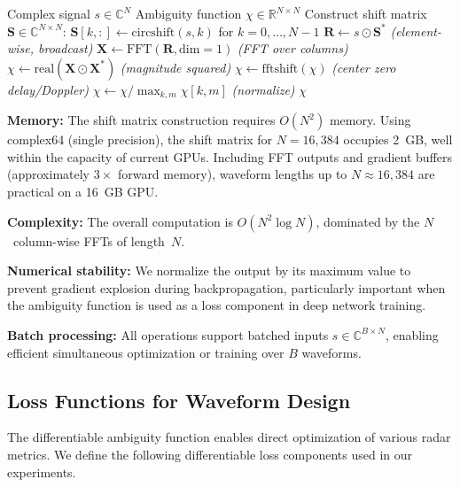 \documentclass[journal]{IEEEtran}
\begin{document}
\begin{algorithm}[t]
\caption{Differentiable Ambiguity Function}
\label{alg:ambiguity}
\begin{algorithmic}[1]
\REQUIRE Complex signal $s \in \mathbb{C}^N$
\ENSURE Ambiguity function $\chi \in \mathbb{R}^{N \times N}$
\STATE Construct shift matrix $\mathbf{S} \in \mathbb{C}^{N \times N}$:
\STATE \quad $\mathbf{S}[k, :] \leftarrow \text{circshift}(s, k)$ for $k = 0, \ldots, N-1$
\STATE $\mathbf{R} \leftarrow s \odot \mathbf{S}^*$ \hfill \textit{(element-wise, broadcast)}
\STATE $\mathbf{X} \leftarrow \text{FFT}(\mathbf{R}, \text{dim}=1)$ \hfill \textit{(FFT over columns)}
\STATE $\chi \leftarrow \text{real}(\mathbf{X} \odot \mathbf{X}^*)$ \hfill \textit{(magnitude squared)}
\STATE $\chi \leftarrow \text{fftshift}(\chi)$ \hfill \textit{(center zero delay/Doppler)}
\STATE $\chi \leftarrow \chi / \max_{k,m} \chi[k,m]$ \hfill \textit{(normalize)}
\RETURN $\chi$
\end{algorithmic}
\end{algorithm}

\textbf{Memory:} The shift matrix construction requires $O(N^2)$ memory.
Using complex64 (single precision), the shift matrix for $N = 16{,}384$ occupies 2~GB, well within the capacity of current GPUs.
Including FFT outputs and gradient buffers (approximately $3\times$ forward memory), waveform lengths up to $N \approx 16{,}384$ are practical on a 16~GB GPU.

\textbf{Complexity:} The overall computation is $O(N^2 \log N)$, dominated by the $N$~column-wise FFTs of length~$N$.

\textbf{Numerical stability:} We normalize the output by its maximum value to prevent gradient explosion during backpropagation, particularly important when the ambiguity function is used as a loss component in deep network training.

\textbf{Batch processing:} All operations support batched inputs $s \in \mathbb{C}^{B \times N}$, enabling efficient simultaneous optimization or training over $B$ waveforms.

\subsection{Loss Functions for Waveform Design}
\label{sec:lossfunctions}

The differentiable ambiguity function enables direct optimization of various radar metrics.
We define the following differentiable loss components used in our experiments.
\end{document}
